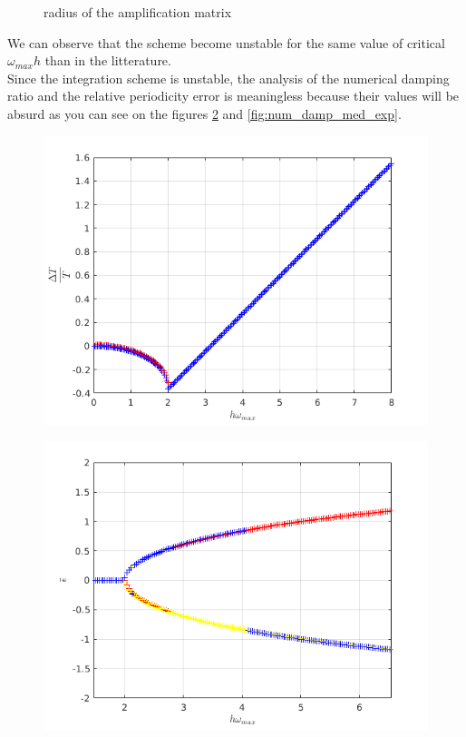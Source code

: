 \begin{itemize}
\begin{figure}[H]
  \caption{radius of the amplification matrix}
  \label{fig:spect_rad_med_exp}
\end{figure}
We can observe that the scheme become unstable for the same value of critical $\omega_{max} h$ than in the litterature. \\
Since the integration scheme is unstable, the analysis of the numerical damping ratio and the relative periodicity error is meaningless because their values will be absurd as you can see on the figures \ref{fig:rel_per_err_med_exp} and \ref{fig:num_damp_med_exp}.  
\begin{figure}[H]
\centering
\begin{minipage}{.5\textwidth}
  \centering
  \includegraphics[width=.98\linewidth]{images/rel_per_err_med_exp.png}
  \label{fig:rel_per_err_med_exp}
\end{minipage}%
\begin{minipage}{.5\textwidth}
  \centering
  \includegraphics[width=.98\linewidth]{images/num_damp_med_exp.png}

\end{minipage}
\end{figure}
\end{itemize}
